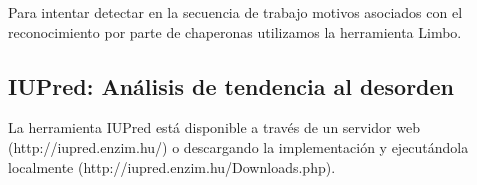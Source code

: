 Para intentar detectar en la secuencia de trabajo motivos asociados con el reconocimiento por parte de chaperonas utilizamos la herramienta Limbo. 


















\subsection{IUPred: Análisis de tendencia al desorden}

La herramienta IUPred está disponible a través de un servidor web (http://iupred.enzim.hu/) o descargando la implementación y ejecutándola localmente (http://iupred.enzim.hu/Downloads.php).   


